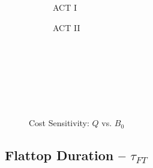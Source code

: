 \begin{figure*}[h!]
\begin{subfigure}[t]{0.45\textwidth}
\begin{adjustbox}{width=\textwidth}
      \Large
      
    \end{adjustbox}
        \caption{ACT I}
    \end{subfigure}
    \hfill
    \begin{subfigure}[t]{0.45\textwidth}
        \centering
    \begin{adjustbox}{width=\textwidth}
      \Large
      
    \end{adjustbox}
        \caption{ACT II}
    \end{subfigure}
    \hfill \hfill ~\\ ~\\ ~\\ ~\\
  \caption[]{Cost Sensitivity: $Q$ vs. $B_0$} ~\\
\end{figure*}


\clearpage

\newpage

\subsection*{ Flattop Duration -- $\tau_{FT}$ }
  \label{subsection:sensitivity_tau_FT}

